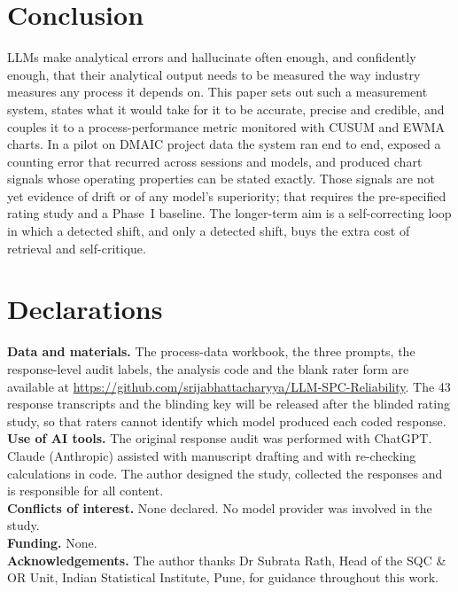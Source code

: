 \documentclass[11pt]{article}
\begin{document}
\section{Conclusion}
LLMs make analytical errors and hallucinate often enough, and confidently enough, that their analytical output needs to be measured the way industry measures any process it depends on. This paper sets out such a measurement system, states what it would take for it to be accurate, precise and credible, and couples it to a process-performance metric monitored with CUSUM and EWMA charts. In a pilot on DMAIC project data the system ran end to end, exposed a counting error that recurred across sessions and models, and produced chart signals whose operating properties can be stated exactly. Those signals are not yet evidence of drift or of any model's superiority; that requires the pre-specified rating study and a Phase~I baseline. The longer-term aim is a self-correcting loop in which a detected shift, and only a detected shift, buys the extra cost of retrieval and self-critique.

\section*{Declarations}
\textbf{Data and materials.} The process-data workbook, the three prompts, the response-level audit labels, the analysis code and the blank rater form are available at \url{https://github.com/srijabhattacharyya/LLM-SPC-Reliability}. The 43 response transcripts and the blinding key will be released after the blinded rating study, so that raters cannot identify which model produced each coded response.\\
\textbf{Use of AI tools.} The original response audit was performed with ChatGPT. Claude (Anthropic) assisted with manuscript drafting and with re-checking calculations in code. The author designed the study, collected the responses and is responsible for all content.\\
\textbf{Conflicts of interest.} None declared. No model provider was involved in the study.\\
\textbf{Funding.} None.\\
\textbf{Acknowledgements.} The author thanks Dr Subrata Rath, Head of the SQC \& OR Unit, Indian Statistical Institute, Pune, for guidance throughout this work.
\end{document}
